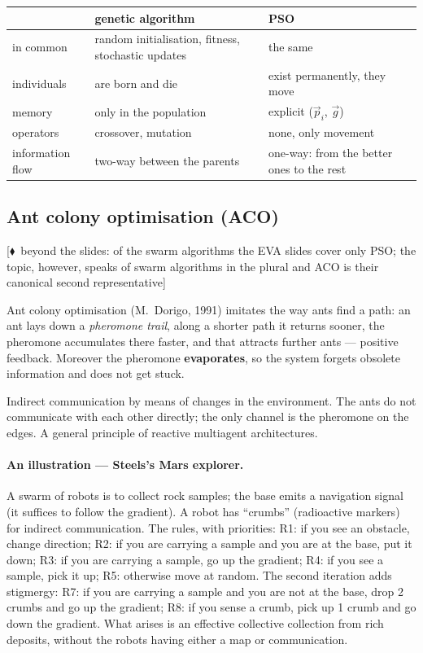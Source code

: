 \documentclass[11pt,a4paper]{article}
\theoremstyle{definition}
\providecommand{\uv}[1]{``#1''}
\newcommand{\mimoq}[1]{\textcolor{markcol}{\textsf{\footnotesize[$\blacklozenge$~beyond the slides: #1]}}}
\begin{document}
\begin{center}
\begin{tabular}{@{}p{5cm}p{5cm}p{5.2cm}@{}}
\toprule
 & \textbf{genetic algorithm} & \textbf{PSO} \\
\midrule
in common & random initialisation, fitness, stochastic updates &
  the same \\
individuals & are born and die & exist permanently, they move \\
memory & only in the population & explicit ($\vec p_i$, $\vec g$) \\
operators & crossover, mutation & none, only movement \\
information flow & two-way between the parents & one-way: from the better ones
  to the rest \\
\bottomrule
\end{tabular}
\end{center}

\subsection{Ant colony optimisation (ACO)}

\noindent\mimoq{of the swarm algorithms the EVA slides cover only PSO; the topic, however, speaks of swarm algorithms in the plural and ACO is their canonical second representative}

Ant colony optimisation (M.~Dorigo, 1991) imitates the way ants find a path: an
ant lays down a \emph{pheromone trail}, along a shorter path it returns sooner,
the pheromone accumulates there faster, and that attracts further ants ---
positive feedback. Moreover the pheromone \textbf{evaporates}, so the system
forgets obsolete information and does not get stuck.

\begin{defbox}[Stigmergy]
Indirect communication by means of changes in the environment. The ants do not
communicate with each other directly; the only channel is the pheromone on the
edges. A general principle of reactive multiagent architectures.
\end{defbox}

\paragraph{An illustration --- Steels's Mars explorer.} A swarm of robots is to
collect rock samples; the base emits a navigation signal (it suffices to follow
the gradient). A robot has \uv{crumbs} (radioactive markers) for indirect
communication. The rules, with priorities:
R1: if you see an obstacle, change direction; R2: if you are carrying a sample
and you are at the base, put it down; R3: if you are carrying a sample, go up
the gradient; R4: if you see a sample, pick it up; R5: otherwise move at random.
The second iteration adds stigmergy: R7: if you are carrying a sample and you
are not at the base, drop 2 crumbs and go up the gradient; R8: if you sense a
crumb, pick up 1 crumb and go down the gradient. What arises is an effective
collective collection from rich deposits, without the robots having either a map
or communication.
\end{document}
